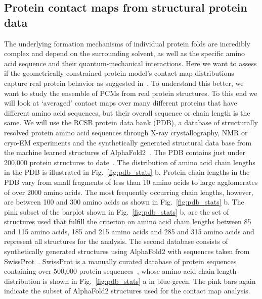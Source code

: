 \documentclass[
reprint,
twocolumn,
amsmath,amssymb,superscriptaddress,aps,
pre]{revtex4-1}
\begin{document}
\subsection{Protein contact maps from structural protein data}

The underlying formation mechanisms of individual protein folds are incredibly complex and depend on the surrounding solvent, as well as the specific amino acid sequence and their quantum-mechanical interactions. Here we want to assess if the geometrically constrained protein model's contact map distributions capture real protein behavior as suggested in~\cite{bartoli2008effecta}. To understand this better, we want to study the ensemble of PCMs from real protein structures. To this end we will look at `averaged' contact maps over many different proteins that have different amino acid sequences, but their overall sequence or chain length is the same. 
We will use the RCSB protein data bank (PDB), a database of structurally resolved protein amino acid sequences through X-ray crystallography, NMR or cryo-EM experiments and the synthetically generated structural data base from the machine learned structures of AlphaFold2~\cite{jumper2021highly}. The PDB contains just under 200,000 protein structures to date~\cite{PDB}. The distribution of amino acid chain lengths in the PDB is illustrated in Fig.~\ref{fig:pdb_stats} b. Protein chain lengths in the PDB vary from small fragments of less than 10 amino acids to large agglomerates of over 2000 amino acids. The most frequently occurring chain lengths, however, are between 100 and 300 amino acids as shown in Fig.~\ref{fig:pdb_stats} b. The pink subset of the barplot shown in Fig.~\ref{fig:pdb_stats} b, are the set of structures used that fulfill the criterion on amino acid chain lengths between 85 and 115 amino acids, 185 and 215 amino acids and 285 and 315 amino acids and represent all structures for the analysis. The second database consists of synthetically generated structures using AlphaFold2 with sequences taken from SwissProt~\cite{alpha fold 2 database}. SwissProt is a manually curated database of protein sequences containing over 500,000 protein sequences~\cite{SwissProt}, whose amino acid chain length distribution is shown in Fig.~\ref{fig:pdb_stats} a in blue-green. The pink bars again indicate the subset of AlphaFold2 structures used for the contact map analysis. 
\end{document}
